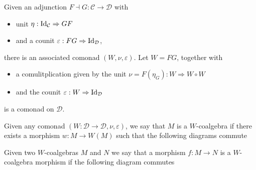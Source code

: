 \documentclass[../thesis.tex]{subfiles}
\begin{document}
    \begin{lemma}
        Given an adjunction $F \dashv G : \mathcal{C} \rightarrow \mathcal{D}$ with
        \begin{itemize}
            \item unit $\eta : \tt{Id}_\mathcal{C} \Rightarrow GF$
            \item and a counit $\varepsilon : FG \Rightarrow \tt{Id}_\mathcal{D}$,
        \end{itemize}
        there is an associated comonad $(W,\nu, \varepsilon)$. Let $W = FG$, together with
        \begin{itemize}
            \item a comulitplication given by the unit $\nu = F(\eta_G) : W \Rightarrow W\circ W$
            \item and the counit $\varepsilon : W \Rightarrow \tt{Id}_\mathcal{D}$
        \end{itemize}
        is a comonad on $\mathcal{D}$.
    \end{lemma}

    Given any comonad $(W : \mathcal{D} \rightarrow \mathcal{D}, \nu, \varepsilon)$, we say that $M$ is a $W$-coalgebra if there exists a morphism $w : M \rightarrow W(M)$ such that the following diagrams commute
    \begin{center}
    \end{center}

    Given two $W$-coalgebras $M$ and $N$ we say that a morphism $f : M \rightarrow N$ is a $W$-coalgebra morphism if the following diagram commutes
    \begin{center}
    \end{center}
\end{document}
